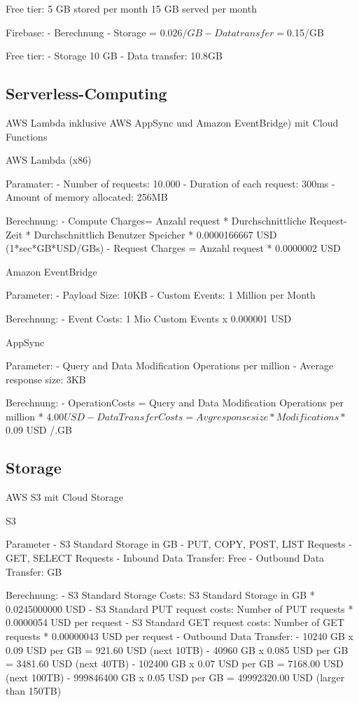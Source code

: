 Free tier:
5 GB stored per month
15 GB served per month

Firebase:
- Berechnung
    - Storage = $0.026/GB
    - Data transfer = $0.15/GB

Free tier:
- Storage 10 GB
- Data transfer: 10.8GB



\subsection{Serverless-Computing}

AWS Lambda inklusive AWS AppSync und Amazon EventBridge) mit Cloud Functions

AWS Lambda (x86)

  Paramater:
  - Number of requests: 10.000
  - Duration of each request: 300ms
  - Amount of memory allocated: 256MB

  Berechnung:
  - Compute Charges= Anzahl request * Durchschnittliche Request-Zeit * Durchschnittlich Benutzer Speicher * 0.0000166667 USD (1*sec*GB*USD/GBs)
  - Request Charges = Anzahl request * 0.0000002 USD

  Amazon EventBridge

  Parameter:
  - Payload Size: 10KB
  - Custom Events: 1 Million per Month

  Berechnung:
  - Event Costs: 1 Mio Custom Events x 0.000001 USD

  AppSync

  Parameter:
  - Query and Data Modification Operations per million
  - Average response size: 3KB

  Berechnung:
  - OperationCosts = Query and Data Modification Operations per million * $4.00 USD
  - Data Transfer Costs = Avg response size * Modifications * $0.09 USD /.GB



\subsection{Storage}

AWS S3 mit Cloud Storage

S3

Parameter
- S3 Standard Storage in GB
- PUT, COPY, POST, LIST Requests
- GET, SELECT Requests
- Inbound Data Transfer: Free
- Outbound Data Transfer: GB

Berechnung:
- S3 Standard Storage Costs: S3 Standard Storage in GB * 0.0245000000 USD
- S3 Standard PUT request costs: Number of PUT requests * 0.0000054 USD per request
- S3 Standard GET request costs: Number of GET requests * 0.00000043 USD per request
- Outbound Data Transfer:
    - 10240 GB x 0.09 USD per GB = 921.60 USD (next 10TB)
    - 40960 GB x 0.085 USD per GB = 3481.60 USD (next 40TB)
    - 102400 GB x 0.07 USD per GB = 7168.00 USD (next 100TB)
    - 999846400 GB x 0.05 USD per GB = 49992320.00 USD (larger than 150TB)





